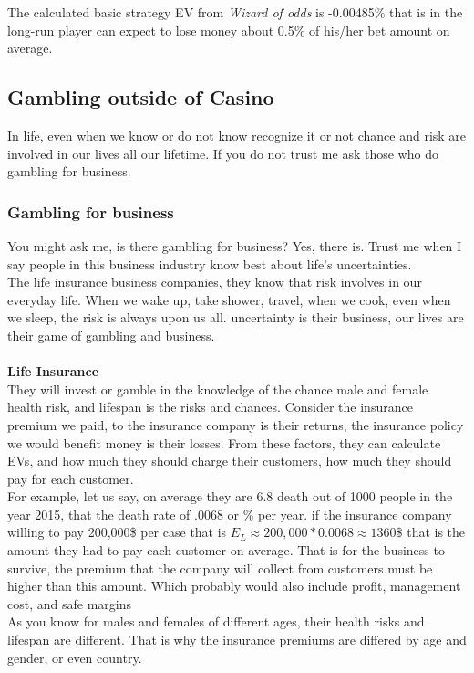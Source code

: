 \documentclass{article}
\begin{document}
The calculated basic strategy EV from \emph{Wizard of odds} is -0.00485\% that is in the long-run player can expect to lose money about 0.5\% of his/her bet amount on average.

\subsection{Gambling outside of Casino}
In life, even when we know or do not know recognize it or not chance and risk are involved in our lives all our lifetime.  If you do not trust me ask those who do gambling for business.  
\subsubsection{Gambling for business}
You might ask me, is there gambling for business?  Yes, there is.  Trust me when I say people in this business industry know best about life's uncertainties.\\

The life insurance business companies, they know that risk involves in our everyday life.  When we wake up, take shower, travel, when we cook, even when we sleep, the risk is always upon us all.  uncertainty is their business, our lives are their game of gambling and business.\\ \\
\textbf{Life Insurance}\\
They will invest or gamble in the knowledge of the chance male and female health risk, and lifespan is the risks and chances.  Consider the insurance premium we paid, to the insurance company is their returns, the insurance policy we would benefit money is their losses.  From these factors, they can calculate EVs, and how much they should charge their customers, how much they should pay for each customer.  \\

For example, let us say, on average they are 6.8 death out of 1000 people in the year 2015, that the death rate of \approx.0068 or \% per year.  if the insurance company willing to pay 200,000\$ per case that is $E_L\approx200,000 * 0.0068\approx1360\$$ that is the amount they had to pay each customer on average.  That is for the business to survive, the premium that the company will collect from customers must be higher than this amount.  Which probably would also include profit, management cost, and safe margins\\

As you know for males and females of different ages, their health risks and lifespan are  different.  That is why the insurance premiums are differed by age and gender, or even country.  \\
\end{document}
